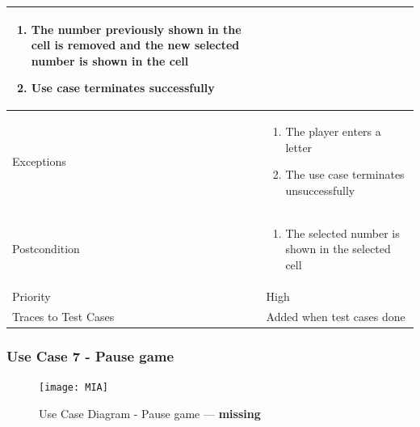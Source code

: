 \documentclass[12pt]{article}
\begin{document}
\begin{center}
\begin{tabular}{ |p{3cm}|p{10cm}| }
\begin{enumerate}
        \item The number previously shown in the cell is removed and the new selected number is shown in the cell
        \item Use case terminates successfully
    \end{enumerate}  \\
    \hline
    Exceptions & 
    \begin{enumerate}
        \item The player enters a letter
        \item The use case terminates unsuccessfully
    \end{enumerate}  \\
    \hline
    Postcondition & 
    \vspace*{-0.2in}
    \begin{enumerate}
        \item The selected number is shown in the selected cell
    \end{enumerate}  \\
    \hline
    Priority & High  \\
    \hline
    Traces to Test Cases & Added when test cases done  \\
    \hline
\end{tabular}
\end{center}

\newpage


\subsubsection{Use Case 7 - Pause game} \label{uc:7}

\begin{figure}[htbp]
    \centering
    \texttt{[image: MIA]}
    \caption{Use Case Diagram - Pause game --- \textbf{missing}}
    \label{fig:MIA}
\end{figure}
\end{document}

